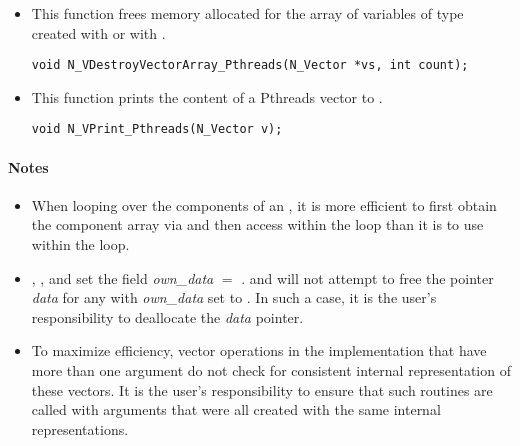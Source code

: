 \begin{itemize}

\item {}

 This function frees memory allocated for the array of  variables of type
  created with  or with
 .

 

 \verb|void N_VDestroyVectorArray_Pthreads(N_Vector *vs, int count);|


\item {}

 This function prints the content of a Pthreads vector to .

 
 
 \verb|void N_VPrint_Pthreads(N_Vector v);|

\end{itemize}
\paragraph{\bf Notes}                                                      
           
\begin{itemize}
                                        
\item
  When looping over the components of an  , it is     
  more efficient to first obtain the component array via       
   and then access  within the     
  loop than it is to use  within the loop.        

\item
  {\warn}, , 
  and  set the field 
  {\em own\_data} $=$ . 
   and 
  will not attempt to free the pointer {\em data} for any  with
  {\em own\_data} set to . In such a case, it is the user's responsibility to
  deallocate the {\em data} pointer.
                                     
\item
  {\warn}To maximize efficiency, vector operations in the {\nvecpthreads} implementation
  that have more than one  argument do not check for
  consistent internal representation of these vectors. It is the user's 
  responsibility to ensure that such routines are called with 
  arguments that were all created with the same internal representations.

\end{itemize}
